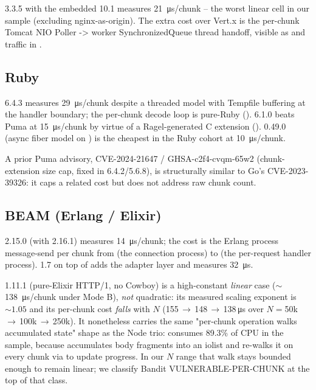 3.3.5 with the embedded  10.1
measures \SI{21}{\micro\second}/chunk -- the worst linear cell in
our sample (excluding nginx-as-origin). The extra cost over Vert.x
is the per-chunk Tomcat NIO Poller -> worker SynchronizedQueue
thread handoff, visible as
 and 
traffic in .

\subsection{Ruby}
\label{sec:pf-ruby}

 6.4.3 measures \SI{29}{\micro\second}/chunk despite a
threaded model with Tempfile buffering at the handler boundary;
the per-chunk decode loop is pure-Ruby
().  6.1.0 beats
Puma at \SI{15}{\micro\second}/chunk by virtue of a Ragel-generated
C extension (). 
0.49.0 (async fiber model on ) is the cheapest
in the Ruby cohort at \SI{10}{\micro\second}/chunk.

A prior Puma advisory, CVE-2024-21647 / GHSA-c2f4-cvqm-65w2
(chunk-extension size cap, fixed in 6.4.2/5.6.8), is structurally
similar to Go's CVE-2023-39326: it caps a related cost but does
not address raw chunk count.

\subsection{BEAM (Erlang / Elixir)}
\label{sec:pf-beam}

 2.15.0 (with  2.16.1) measures
\SI{14}{\micro\second}/chunk; the cost is the Erlang process
message-send per chunk from
 (the connection process) to
 (the per-request handler process).
 1.7 on top of  adds the
 adapter layer and measures \SI{32}{\micro\second}.

 1.11.1 (pure-Elixir HTTP/1, no Cowboy) is a
high-constant \emph{linear} case ($\sim$\SI{138}{\micro\second}/chunk
under Mode B), \emph{not} quadratic: its measured scaling
exponent is $\sim 1.05$ and its per-chunk cost \emph{falls} with
$N$ (155\,$\to$\,148\,$\to$\,138\,\si{\micro\second} over
$N{=}$50k\,$\to$\,100k\,$\to$\,250k). It nonetheless carries the
same "per-chunk operation walks accumulated state" shape as the
Node trio:  consumes 89.3\% of CPU
in the  sample, because
 accumulates body
fragments into an iolist and re-walks it on every chunk via
 to update progress. In our $N$ range that
walk stays bounded enough to remain linear; we classify Bandit
VULNERABLE-PER-CHUNK at the top of that class.

